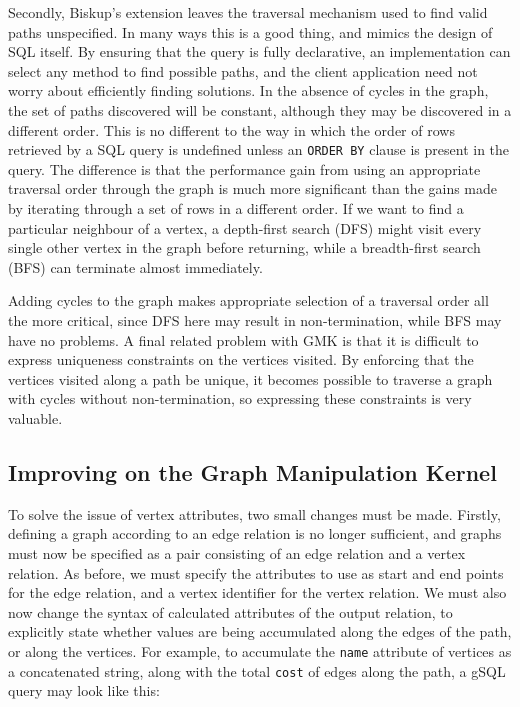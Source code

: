 Secondly, Biskup's extension leaves the traversal mechanism used to find valid
paths unspecified. In many ways this is a good thing, and mimics the design of
SQL itself. By ensuring that the  query is fully declarative, an
implementation can select any method to find possible paths, and the client
application need not worry about efficiently finding solutions. In the absence
of cycles in the graph, the set of paths discovered will be constant, although
they may be discovered in a different order. This is no different to the way
in which the order of rows retrieved by a SQL query is undefined unless an
\texttt{ORDER BY} clause is present in the query. The difference is that the
performance gain from using an appropriate traversal order through the graph
is much more significant than the gains made by iterating through a set of
rows in a different order. If we want to find a particular neighbour of a
vertex, a depth-first search (DFS) might visit every single other vertex in the
graph before returning, while a breadth-first search (BFS) can terminate
almost immediately. 

Adding cycles to the graph makes appropriate selection of a traversal order
all the more critical, since DFS here may result in non-termination, while
BFS may have no problems. A final related problem with GMK is that it is
difficult to express uniqueness constraints on the vertices visited. By
enforcing that the vertices visited along a path be unique, it becomes
possible to traverse a graph with cycles without non-termination, so
expressing these constraints is very valuable.



\subsection{Improving on the Graph Manipulation Kernel}

To solve the issue of vertex attributes, two small changes must be made.
Firstly, defining a graph according to an edge relation is no longer
sufficient,  and graphs must now be specified as a pair consisting of an edge
relation and a vertex relation. As before, we must specify the attributes to
use as start and end points for the edge relation, and a vertex identifier for
the vertex relation. We must also now change the syntax of calculated
attributes of the output relation, to explicitly state whether values are
being accumulated along the edges of the path, or along the vertices. For
example, to accumulate the \texttt{name} attribute of vertices as a
concatenated string, along with the total \texttt{cost} of edges along the
path, a gSQL query may look like this:

